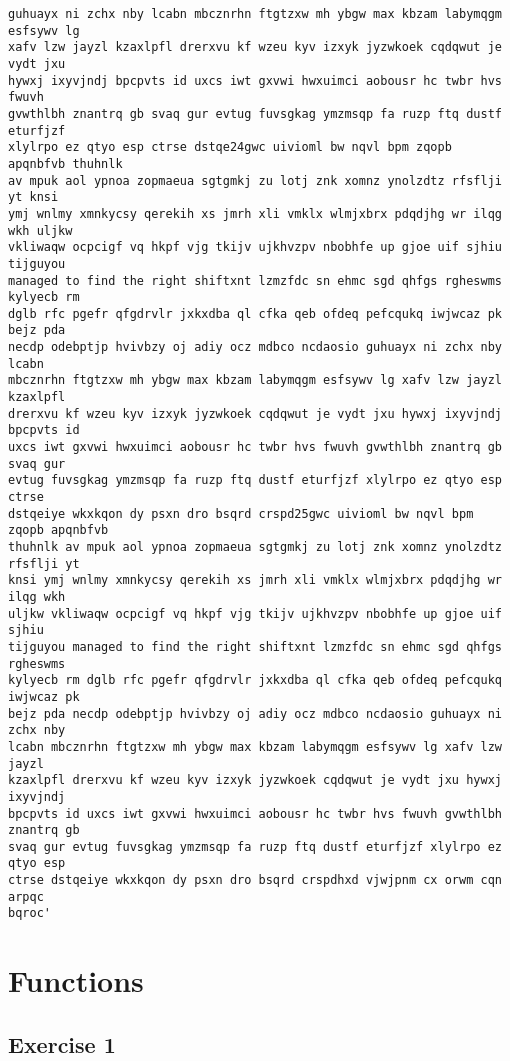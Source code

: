 \documentclass[11pt]{article}
\begin{document}
\begin{tcolorbox}[breakable, size=fbox, boxrule=.5pt, pad at break*=1mm, opacityfill=0]
\begin{Verbatim}[commandchars=\\\{\}]
guhuayx ni zchx nby lcabn mbcznrhn ftgtzxw mh ybgw max kbzam labymqgm esfsywv lg
xafv lzw jayzl kzaxlpfl drerxvu kf wzeu kyv izxyk jyzwkoek cqdqwut je vydt jxu
hywxj ixyvjndj bpcpvts id uxcs iwt gxvwi hwxuimci aobousr hc twbr hvs fwuvh
gvwthlbh znantrq gb svaq gur evtug fuvsgkag ymzmsqp fa ruzp ftq dustf eturfjzf
xlylrpo ez qtyo esp ctrse dstqe24gwc uivioml bw nqvl bpm zqopb apqnbfvb thuhnlk
av mpuk aol ypnoa zopmaeua sgtgmkj zu lotj znk xomnz ynolzdtz rfsflji yt knsi
ymj wnlmy xmnkycsy qerekih xs jmrh xli vmklx wlmjxbrx pdqdjhg wr ilqg wkh uljkw
vkliwaqw ocpcigf vq hkpf vjg tkijv ujkhvzpv nbobhfe up gjoe uif sjhiu tijguyou
managed to find the right shiftxnt lzmzfdc sn ehmc sgd qhfgs rgheswms kylyecb rm
dglb rfc pgefr qfgdrvlr jxkxdba ql cfka qeb ofdeq pefcqukq iwjwcaz pk bejz pda
necdp odebptjp hvivbzy oj adiy ocz mdbco ncdaosio guhuayx ni zchx nby lcabn
mbcznrhn ftgtzxw mh ybgw max kbzam labymqgm esfsywv lg xafv lzw jayzl kzaxlpfl
drerxvu kf wzeu kyv izxyk jyzwkoek cqdqwut je vydt jxu hywxj ixyvjndj bpcpvts id
uxcs iwt gxvwi hwxuimci aobousr hc twbr hvs fwuvh gvwthlbh znantrq gb svaq gur
evtug fuvsgkag ymzmsqp fa ruzp ftq dustf eturfjzf xlylrpo ez qtyo esp ctrse
dstqeiye wkxkqon dy psxn dro bsqrd crspd25gwc uivioml bw nqvl bpm zqopb apqnbfvb
thuhnlk av mpuk aol ypnoa zopmaeua sgtgmkj zu lotj znk xomnz ynolzdtz rfsflji yt
knsi ymj wnlmy xmnkycsy qerekih xs jmrh xli vmklx wlmjxbrx pdqdjhg wr ilqg wkh
uljkw vkliwaqw ocpcigf vq hkpf vjg tkijv ujkhvzpv nbobhfe up gjoe uif sjhiu
tijguyou managed to find the right shiftxnt lzmzfdc sn ehmc sgd qhfgs rgheswms
kylyecb rm dglb rfc pgefr qfgdrvlr jxkxdba ql cfka qeb ofdeq pefcqukq iwjwcaz pk
bejz pda necdp odebptjp hvivbzy oj adiy ocz mdbco ncdaosio guhuayx ni zchx nby
lcabn mbcznrhn ftgtzxw mh ybgw max kbzam labymqgm esfsywv lg xafv lzw jayzl
kzaxlpfl drerxvu kf wzeu kyv izxyk jyzwkoek cqdqwut je vydt jxu hywxj ixyvjndj
bpcpvts id uxcs iwt gxvwi hwxuimci aobousr hc twbr hvs fwuvh gvwthlbh znantrq gb
svaq gur evtug fuvsgkag ymzmsqp fa ruzp ftq dustf eturfjzf xlylrpo ez qtyo esp
ctrse dstqeiye wkxkqon dy psxn dro bsqrd crspdhxd vjwjpnm cx orwm cqn arpqc
bqroc'
\end{Verbatim}
\end{tcolorbox}
        
    \section{Functions}\label{functions}

    \subsection{Exercise 1}\label{exercise-1}
\end{document}

